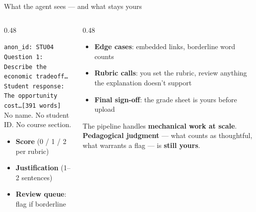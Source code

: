 \begin{frame}{What the agent sees --- and what stays yours}
\vskip2pt
\begin{columns}[T]
\begin{column}{0.48\textwidth}
\begin{tcolorbox}[pipelinebox, title={\faEye\quad The agent receives}]
\scriptsize
\texttt{anon\_id: STU04}\\
\texttt{Question 1: Describe the economic tradeoff\ldots}\\
\texttt{Student response: The opportunity cost\ldots [391 words]}\\[3pt]
No name. No student ID. No course section.
\end{tcolorbox}
\vskip3pt
\begin{tcolorbox}[pipelinebox, title={\faBrain\quad The agent returns}]
\scriptsize
\begin{itemize}\setlength{\itemsep}{1pt}
  \item \textbf{Score} (0 / 1 / 2 per rubric)
  \item \textbf{Justification} (1--2 sentences)
  \item \textbf{Review queue}: flag if borderline
\end{itemize}
\end{tcolorbox}
\end{column}
\begin{column}{0.48\textwidth}
\begin{tcolorbox}[keybox, title={\faUserCheck\quad Your judgment}]
\scriptsize
\begin{itemize}\setlength{\itemsep}{2pt}
  \item \textbf{Edge cases}: embedded links, borderline word counts
  \item \textbf{Rubric calls}: you set the rubric, review anything the explanation doesn't support
  \item \textbf{Final sign-off}: the grade sheet is yours before upload
\end{itemize}
\end{tcolorbox}
\vskip3pt
\begin{tcolorbox}[accentbox, top=3pt, bottom=3pt]
\scriptsize
The pipeline handles \textbf{mechanical work at scale}. \textbf{Pedagogical judgment} --- what counts as thoughtful, what warrants a flag --- is \textbf{still yours}.
\end{tcolorbox}
\end{column}
\end{columns}
\end{frame}

